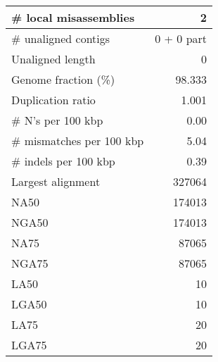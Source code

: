 \documentclass[12pt,a4paper]{article}
\begin{document}
\begin{table}[ht]
\begin{center}
\begin{tabular}{|l*{1}{|r}|}
\# local misassemblies & 2 \\ \hline
\# unaligned contigs & 0 + 0 part \\ \hline
Unaligned length & 0 \\ \hline
Genome fraction (\%) & 98.333 \\ \hline
Duplication ratio & 1.001 \\ \hline
\# N's per 100 kbp & 0.00 \\ \hline
\# mismatches per 100 kbp & 5.04 \\ \hline
\# indels per 100 kbp & 0.39 \\ \hline
Largest alignment & 327064 \\ \hline
NA50 & 174013 \\ \hline
NGA50 & 174013 \\ \hline
NA75 & 87065 \\ \hline
NGA75 & 87065 \\ \hline
LA50 & 10 \\ \hline
LGA50 & 10 \\ \hline
LA75 & 20 \\ \hline
LGA75 & 20 \\ \hline
\end{tabular}
\end{center}
\end{table}
\end{document}
